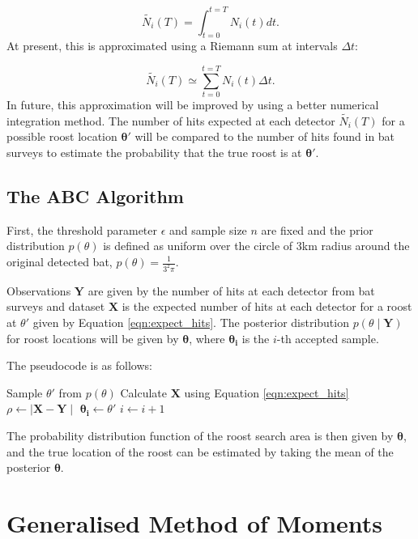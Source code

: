 \begin{equation}
  \tilde{N_i}(T) = \int_{t=0}^{t=T} N_i(t) dt.
\end{equation}
%
At present, this is approximated using a Riemann sum at intervals $\Delta t$:

\begin{equation}
  \tilde{N_i}(T) \simeq \sum_{t=0}^{t=T} N_i(t) \Delta t.
  \label{eqn:expect_hits}
\end{equation}
%
In future, this approximation will be improved by using a better numerical
integration method. The number of hits expected at each detector $\tilde{N_i}(T)$ for a possible roost location $\bm{\theta'}$ will be compared to the number of hits found in bat surveys to estimate the probability that the true roost is at $\bm{\theta'}$.




\subsection{The ABC Algorithm}

First, the threshold parameter $\epsilon$ and sample size $n$ are fixed and the
prior distribution $p(\theta)$ is defined as uniform over the circle of 3km
radius around the original detected bat, $p(\theta) = \frac{1}{3^2 \pi}$.

Observations $\bm{Y}$ are given by the number of hits at each detector from bat
surveys and dataset $\bm{X}$ is the expected number of hits at each detector for
a roost at $\theta'$ given by Equation \ref{eqn:expect_hits}. The posterior
distribution $p(\theta \mid \bm{Y})$ for roost locations will be given by
$\bm{\theta}$, where $\bm{\theta_i}$ is the $i$-th accepted sample.

The pseudocode is as follows:

\begin{algorithmic}
    \State  Sample $\theta'$ from $p(\theta)$
    \State Calculate $\bm{X}$ using Equation \ref{eqn:expect_hits}
    \State $\rho \gets \mid \bm{X} - \bm{Y} \mid$
    \If {$\bar{\rho} < \epsilon$}
      \State $\bm{\theta_i} \gets \theta'$
    	\State $i \gets i + 1$
    \EndIf
  \EndWhile
\end{algorithmic}

The probability distribution function of the roost search area is then given by $\bm{\theta}$, and the true location of the
roost can be estimated by taking the mean of the posterior $\bm{\theta}$.


\section{Generalised Method of Moments}

